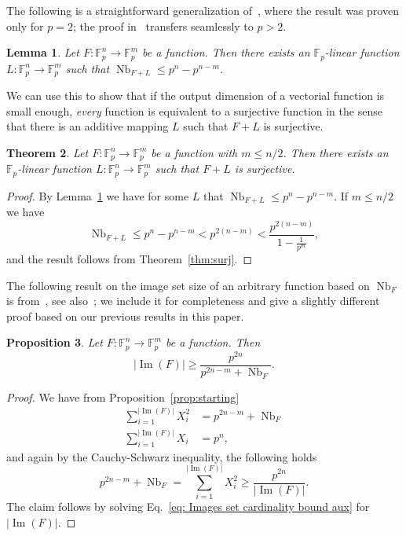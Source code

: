 \documentclass[11pt]{article}
\newcommand{\F}{\mathbb F}
\DeclareMathOperator{\Nb}{Nb}
\theoremstyle{plain}
\newtheorem{theorem}{Theorem}[section]
\newtheorem{lemma}[theorem]{Lemma}
\newtheorem{proposition}[theorem]{Proposition}
\theoremstyle{definition}
\numberwithin{theorem}{section}
\numberwithin{equation}{section}
\numberwithin{table}{section}
\numberwithin{figure}{section}
\DeclareMathOperator{\image}{Im}
\begin{document}
{The following is a straightforward generalization of~\cite[Proposition 3]{carlet2011relating}, where the result was proven only for $p=2$; the proof in~\cite{carlet2011relating} transfers seamlessly to $p>2$.

\begin{lemma} \label{lem:carlet}
    Let $F \colon \F_{p}^n \rightarrow \F_{p}^m$ be a function. Then there exists an $\F_p$-linear function $L \colon \F_{p}^n \rightarrow \F_{p}^m$ such that $\Nb_{F+L}\leq p^n-p^{n-m}$.
\end{lemma}

We can use this to show that if the output dimension of a vectorial function is small enough, \emph{every} function is equivalent to a surjective function in the sense that there is an additive mapping $L$ such that $F+L$ is surjective.

\begin{theorem}\label{th: everything is surjective}
    Let $F \colon \F_{p}^n \rightarrow \F_{p}^m$ be a function with $m\leq n/2$. Then there exists an $\F_p$-linear function $L\colon \F_{p}^n \rightarrow \F_{p}^m$ such that $F+L$ is surjective.
\end{theorem}
\begin{proof}
    By Lemma~\ref{lem:carlet} we have for some $L$ that $\Nb_{F+L} \leq p^n-p^{n-m}$. If $m \leq n/2$ we have $$\Nb_{F+L}\leq p^n-p^{n-m} <p^{2(n-m)}<\frac{p^{2(n-m)}}{1-\frac{1}{p^m}},$$
    and the result follows from Theorem~\ref{thm:surj}.
\end{proof}

The following result on the image set size of an arbitrary function based on $\Nb_F$ is from~\cite[Lemma 1]{Koelsch2023}, see also~\cite[Lemma 5]{carlet2017trade}; we include it for completeness and give a slightly different proof based on our previous results in this paper.
\begin{proposition} \label{prop:imageset}
    Let $F \colon \F_{p}^n \rightarrow \F_{p}^m$ be a function. Then
    \[|\image (F)| \geq \frac{p^{2n}}{p^{2n-m}+\Nb_F}.\]
\end{proposition}
\begin{proof}
    We have from Proposition~\ref{prop:starting}
		\begin{align*}
	\sum_{i=1}^{|\image(F)|} X_i^2&=p^{2n-m}+\Nb_F \\
	\sum_{i=1}^{|\image(F)|} X_i&=p^n,
\end{align*}
	and again by the Cauchy-Schwarz inequality, the following holds
	\begin{equation}\label{eq: Images set cardinality bound aux}
	    p^{2n-m}+\Nb_F=\sum_{i=1}^{|\image(F)|} X_i^2\geq\frac{p^{2n}}{|\image(F)|}.
	\end{equation}
	The claim follows by solving Eq.~\eqref{eq: Images set cardinality bound aux} for $|\image(F)|$.
\end{proof}

}
\end{document}
